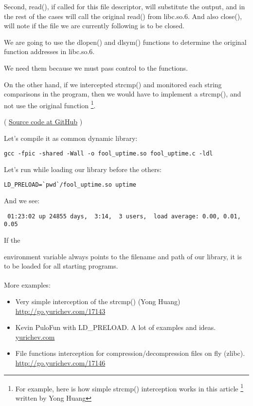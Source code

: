 Second, read(), if called for this file descriptor, will substitute the output,
and in the rest of the cases will call the original read() from libc.so.6.
And also close(), 
will note if the file we are currently following is to be closed.


We are going to use the dlopen() and dlsym() functions to determine the original function addresses in libc.so.6.

We need them because we must pass control to the  functions.


On the other hand, if we intercepted strcmp() and monitored each string
comparisons in the program, then we would have to implement a strcmp(), and not
use the original function
\footnote{For example, here is how simple strcmp() interception works in this article
\footnote{\href{http://go.yurichev.com/17143}{yurichev.com}}
written by Yong Huang}.


( \href{https://github.com/dennis714/RE-for-beginners/blob/master/OS/LD_PRELOAD/fool_uptime.c}{Source code at GitHub} )

Let's compile it as common dynamic library:

\begin{lstlisting}
gcc -fpic -shared -Wall -o fool_uptime.so fool_uptime.c -ldl
\end{lstlisting}

Let's run 
while loading our library before the others:

\begin{lstlisting}
LD_PRELOAD=`pwd`/fool_uptime.so uptime
\end{lstlisting}

And we see:

\begin{lstlisting}
 01:23:02 up 24855 days,  3:14,  3 users,  load average: 0.00, 0.01, 0.05
\end{lstlisting}

If the  

environment variable always points to the filename and path of our library, 
it is to be loaded for all starting programs. \\
\\
More examples:

\begin{itemize}

\item
Very simple interception of the strcmp() (Yong Huang) 
\url{http://go.yurichev.com/17143}

\item
Kevin Pulo\EMDASH{}Fun with LD\_PRELOAD. A lot of examples and ideas.
\href{http://go.yurichev.com/17145}{yurichev.com}

\item
File functions interception for compression/decompression files on fly (zlibc). \url{http://go.yurichev.com/17146}

\end{itemize}
